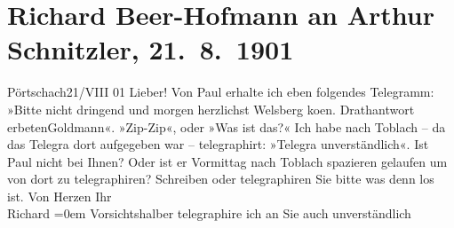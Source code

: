 

         
         \renewcommand{\erwaehntePersonen}{Personen: Richard Beer-Hofmann, Paul Goldmann}
         \renewcommand{\erwaehnteOrte}{Orte: Pörtschach, Toblach, Welsberg-Taisten}
         \renewcommand{\erwaehnteWerke}{}
               \section[Richard Beer-Hofmann an Arthur Schnitzler, 21. 8. 1901]{ Richard Beer-Hofmann an Arthur Schnitzler, 21. 8. 1901}\nopagebreak{}\rehead{ }\begin{ledgroupsized}[t]{13cm}\normalsize\beginnumbering{} \toendnotes[C]{\smallbreak\pagebreak[2]} 
\pstart
           \raggedleft{}{\pb}Pörtschach21/VIII 01\pend
           \pstart
           Lieber! Von Paul erhalte ich
               eben folgendes Telegramm:\pend
           \pstart
           »Bitte nicht dringend und morgen herzlichst Welsberg ko{\geminationm}en. Drathantwort
                  erbeten\hspace*{1.5em}Goldmann«.\pend
           \pstart
           »Zip-Zip«, oder »Was ist das?« Ich habe nach Toblach – da das Telegra{\geminationm} dort aufgegeben war –
               telegraphirt: »Telegra{\geminationm} unverständlich«.\pend
           \pstart
           Ist Paul nicht bei Ihnen? Oder ist er
               Vormittag nach Toblach spazieren gelaufen um von
               dort zu tele{\pb}graphiren? Schreiben
               oder telegraphiren Sie bitte was denn los ist.\pend
           \pstart
           Von Herzen Ihr{\\[\baselineskip]}\spacefill\mbox{Richard}\pend
           \leftskip=0em{}\pstart
           Vorsichtshalber telegraphire ich an Sie auch unverständlich\pend
           
         
         \endnumbering{}\end{ledgroupsized}  \newcommand{\dateiname}{L01166}\newcommand{\titel}{Richard Beer-Hofmann an Arthur Schnitzler, 21. 8. 1901}\newcommand{\editorInnen}{Martin Anton Müller und Gerd-Hermann Susen}
      